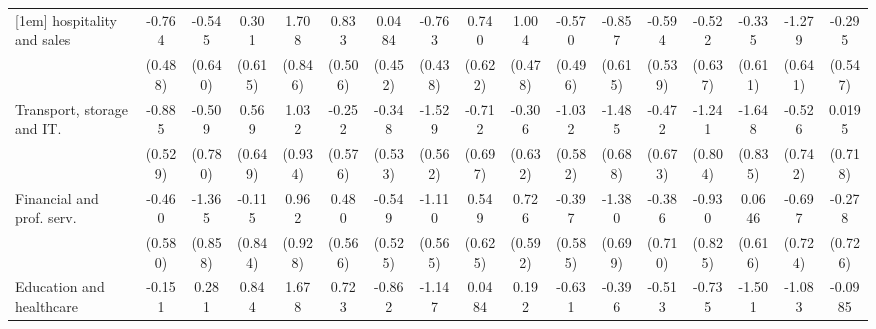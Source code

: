 {\begin{tabular}{l*{16}{c}}
[1em]
hospitality and sales&      -0.764         &      -0.545         &       0.301         &       1.708\sym{*}  &       0.833         &      0.0484         &      -0.763         &       0.740         &       1.004\sym{*}  &      -0.570         &      -0.857         &      -0.594         &      -0.522         &      -0.335         &      -1.279\sym{*}  &      -0.295         \\
                    &     (0.488)         &     (0.640)         &     (0.615)         &     (0.846)         &     (0.506)         &     (0.452)         &     (0.438)         &     (0.622)         &     (0.478)         &     (0.496)         &     (0.615)         &     (0.539)         &     (0.637)         &     (0.611)         &     (0.641)         &     (0.547)         \\
[1em]
Transport, storage and IT.&      -0.885         &      -0.509         &       0.569         &       1.032         &      -0.252         &      -0.348         &      -1.529\sym{**} &      -0.712         &      -0.306         &      -1.032         &      -1.485\sym{*}  &      -0.472         &      -1.241         &      -1.648\sym{*}  &      -0.526         &      0.0195         \\
                    &     (0.529)         &     (0.780)         &     (0.649)         &     (0.934)         &     (0.576)         &     (0.533)         &     (0.562)         &     (0.697)         &     (0.632)         &     (0.582)         &     (0.688)         &     (0.673)         &     (0.804)         &     (0.835)         &     (0.742)         &     (0.718)         \\
[1em]
Financial and prof. serv.&      -0.460         &      -1.365         &      -0.115         &       0.962         &       0.480         &      -0.549         &      -1.110\sym{*}  &       0.549         &       0.726         &      -0.397         &      -1.380\sym{*}  &      -0.386         &      -0.930         &      0.0646         &      -0.697         &      -0.278         \\
                    &     (0.580)         &     (0.858)         &     (0.844)         &     (0.928)         &     (0.566)         &     (0.525)         &     (0.565)         &     (0.625)         &     (0.592)         &     (0.585)         &     (0.699)         &     (0.710)         &     (0.825)         &     (0.616)         &     (0.724)         &     (0.726)         \\
[1em]
Education and healthcare&      -0.151         &       0.281         &       0.844         &       1.678         &       0.723         &      -0.862         &      -1.147\sym{*}  &      0.0484         &       0.192         &      -0.631         &      -0.396         &      -0.513         &      -0.735         &      -1.501\sym{*}  &      -1.083         &     -0.0985         \\

\end{tabular}}
